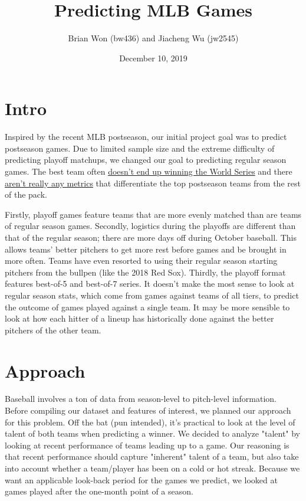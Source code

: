 \documentclass[12pt,onecolumn]{article}
\begin{document}
\DontPrintSemicolon
\title{Predicting MLB Games}
\author{Brian Won (bw436) and Jiacheng Wu (jw2545)}
\date{December 10, 2019}
\maketitle

\section*{Intro}
Inspired by the recent MLB postseason, our initial project goal was to predict postseason games. Due to limited sample size and the extreme difficulty of predicting playoff matchups, we changed our goal to predicting regular season games. The best team often \href{https://www.espn.com/mlb/story/_/page/playoffs16_whydontthebestteamswinitall/why-difficult-best-mlb-teams-win-all}{doesn't end up winning the World Series} and there \href{https://theathletic.com/1234635/2019/09/24/sarris-what-if-anything-predicts-a-teams-success-in-the-postseason/}{aren't really any metrics} that differentiate the top postseason teams from the rest of the pack. \vspace*{4mm}

\noindent
Firstly, playoff games feature teams that are more evenly matched than are teams of regular season games. Secondly, logistics during the playoffs are different than that of the regular season; there are more days off during October baseball. This allows teams' better pitchers to get more rest before games and be brought in more often. Teams have even resorted to using their regular season starting pitchers from the bullpen (like the 2018 Red Sox). Thirdly, the playoff format features best-of-5 and best-of-7 series. It doesn't make the most sense to look at regular season stats, which come from games against teams of all tiers, to predict the outcome of games played against a single team. It may be more sensible to look at how each hitter of a lineup has historically done against the better pitchers of the other team.

\section*{Approach}
Baseball involves a ton of data from season-level to pitch-level information. Before compiling our dataset and features of interest, we planned our approach for this problem. Off the bat (pun intended), it's practical to look at the level of talent of both teams when predicting a winner. We decided to analyze "talent" by looking at recent performance of teams leading up to a game. Our reasoning is that recent performance should capture "inherent" talent of a team, but also take into account whether a team/player has been on a cold or hot streak. Because we want an applicable look-back period for the games we predict, we looked at games played after the one-month point of a season. \vspace*{4mm}
\end{document}
